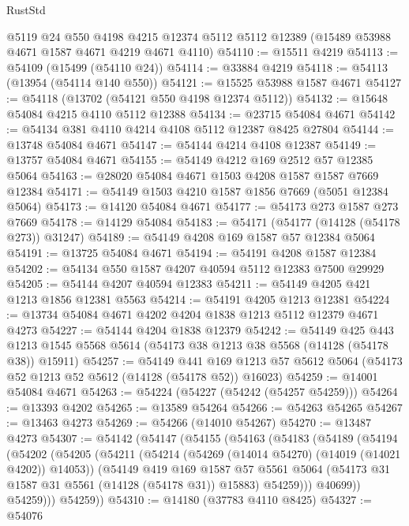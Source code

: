 \begin{lexlean}{RustStd}
\begin{coremodule}
    @5119
    @24
    @550
    @4198
    @4215
    @12374
    @5112
    @5112
    @12389
    (@15489 @53988 @4671 @1587 @4671 @4219 @4671 @4110)
@54110 := @15511 @4219
@54113 := @54109 (@15499 (@54110 @24))
@54114 := @33884 @4219
@54118 := @54113 (@13954 (@54114 @140 @550))
@54121 := @15525 @53988 @1587 @4671
@54127 := @54118 (@13702 (@54121 @550 @4198 @12374 @5112))
@54132 := @15648 @54084 @4215 @4110 @5112 @12388
@54134 := @23715 @54084 @4671
@54142 := @54134 @381 @4110 @4214 @4108 @5112 @12387 @8425 @27804
@54144 := @13748 @54084 @4671
@54147 := @54144 @4214 @4108 @12387
@54149 := @13757 @54084 @4671
@54155 := @54149 @4212 @169 @2512 @57 @12385 @5064
@54163 := @28020 @54084 @4671 @1503 @4208 @1587 @1587 @7669 @12384
@54171 := @54149 @1503 @4210 @1587 @1856 @7669 (@5051 @12384 @5064)
@54173 := @14120 @54084 @4671
@54177 := @54173 @273 @1587 @273 @7669
@54178 := @14129 @54084
@54183 := @54171 (@54177 (@14128 (@54178 @273)) @31247)
@54189 := @54149 @4208 @169 @1587 @57 @12384 @5064
@54191 := @13725 @54084 @4671
@54194 := @54191 @4208 @1587 @12384
@54202 := @54134 @550 @1587 @4207 @40594 @5112 @12383 @7500 @29929
@54205 := @54144 @4207 @40594 @12383
@54211 := @54149 @4205 @421 @1213 @1856 @12381 @5563
@54214 := @54191 @4205 @1213 @12381
@54224 := @13734 @54084 @4671 @4202 @4204 @1838 @1213 @5112 @12379 @4671 @4273
@54227 := @54144 @4204 @1838 @12379
@54242 := @54149
    @425
    @443
    @1213
    @1545
    @5568
    @5614
    (@54173 @38 @1213 @38 @5568 (@14128 (@54178 @38)) @15911)
@54257 := @54149
    @441
    @169
    @1213
    @57
    @5612
    @5064
    (@54173 @52 @1213 @52 @5612 (@14128 (@54178 @52)) @16023)
@54259 := @14001 @54084 @4671
@54263 := @54224 (@54227 (@54242 (@54257 @54259)))
@54264 := @13393 @4202
@54265 := @13589 @54264
@54266 := @54263 @54265
@54267 := @13463 @4273
@54269 := @54266 (@14010 @54267)
@54270 := @13487 @4273
@54307 := @54142
    (@54147
      (@54155
        (@54163
          (@54183
            (@54189
              (@54194
                (@54202
                  (@54205
                    (@54211
                      (@54214 (@54269 (@14014 @54270) (@14019 (@14021 @4202)) @14053))
                      (@54149
                        @419
                        @169
                        @1587
                        @57
                        @5561
                        @5064
                        (@54173 @31 @1587 @31 @5561 (@14128 (@54178 @31)) @15883)
                        @54259)))
                  @40699))
              @54259)))
        @54259))
@54310 := @14180 (@37783 @4110 @8425)
@54327 := @54076

\end{coremodule}
\end{lexlean}
